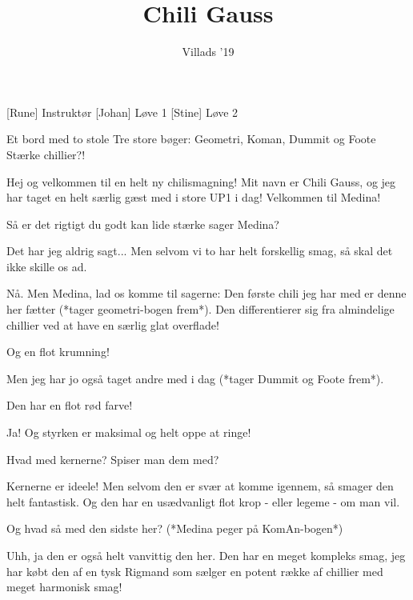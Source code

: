 \documentclass[a4paper,11pt]{article}
\title{Chili Gauss}
\author{Villads ’19}
\begin{document}
\maketitle

\begin{roles}
[Rune] Instruktør
[Johan] Løve 1
[Stine] Løve 2
\end{roles}

\begin{props}
 Et bord med to stole
 Tre store bøger: Geometri, Koman, Dummit og Foote
 Stærke chillier?!
\end{props}


\begin{sketch}

 Hej og velkommen til en helt ny chilismagning! Mit navn er Chili Gauss, og jeg har taget en helt særlig gæst med i store UP1 i dag! Velkommen til Medina!


 Så er det rigtigt du godt kan lide stærke sager Medina?

 Det har jeg aldrig sagt... Men selvom vi to har helt forskellig smag, så skal det ikke skille os ad.

 Nå. Men Medina, lad os komme til sagerne: Den første chili jeg har med er denne her fætter (*tager geometri-bogen frem*). Den differentierer sig fra almindelige chillier ved at have en særlig glat overflade!

 Og en flot krumning!


 Men jeg har jo også taget andre med i dag (*tager Dummit og Foote frem*).

 Den har en flot rød farve!

 Ja! Og styrken er maksimal og helt oppe at ringe!

 Hvad med kernerne? Spiser man dem med?

 Kernerne er ideele! Men selvom den er svær at komme igennem, så smager den helt fantastisk. Og den har en usædvanligt flot krop - eller legeme - om man vil.

 Og hvad så med den sidste her? (*Medina peger på KomAn-bogen*)

 Uhh, ja den er også helt vanvittig den her. Den har en meget kompleks smag, jeg har købt den af en tysk Rigmand som sælger en potent række af chillier med meget harmonisk smag!


\end{sketch}
\end{document}
